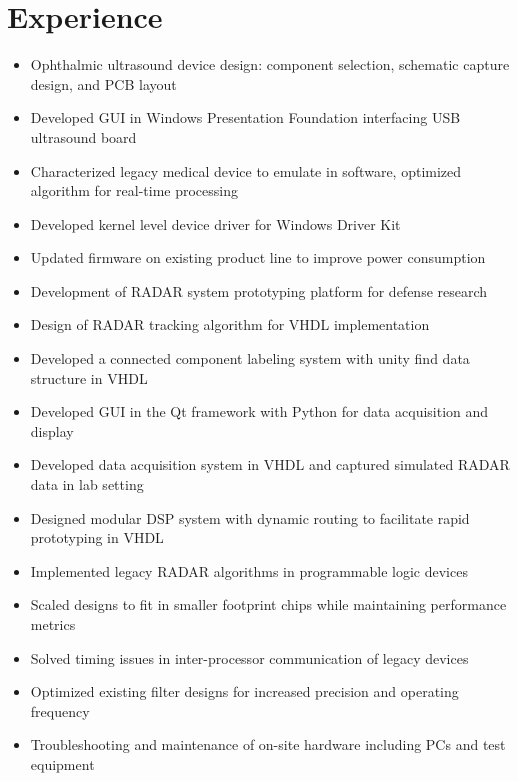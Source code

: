 \documentclass[10pt,letterpaper,roman]{moderncv}
\begin{document}
\makecvtitle

\vspace*{-2\baselineskip}
\section{Experience}

\begin{itemize}
\item Ophthalmic ultrasound device design: component selection, schematic capture design, and PCB layout
\item Developed GUI in Windows Presentation Foundation interfacing USB ultrasound board
\item Characterized legacy medical device to emulate in software, optimized algorithm for real-time processing
\item Developed kernel level device driver for Windows Driver Kit
\item Updated firmware on existing product line to improve power consumption
\end{itemize}
\smallskip

\begin{itemize}
\item Development of RADAR system prototyping platform for defense research
\item Design of RADAR tracking algorithm for VHDL implementation
\item Developed a connected component labeling system with unity find data structure in VHDL
\item Developed GUI in the Qt framework with Python for data acquisition and display
\item Developed data acquisition system in VHDL and captured simulated RADAR data in lab setting
\end{itemize}
\smallskip

\begin{itemize}
\item Designed modular DSP system with dynamic routing to facilitate rapid prototyping in VHDL
\item Implemented legacy RADAR algorithms in programmable logic devices
\item Scaled designs to fit in smaller footprint chips while maintaining performance metrics
\item Solved timing issues in inter-processor communication of legacy devices
\item Optimized existing filter designs for increased precision and operating frequency
\item Troubleshooting and maintenance of on-site hardware including PCs and test equipment
\end{itemize}
\smallskip
\end{document}
